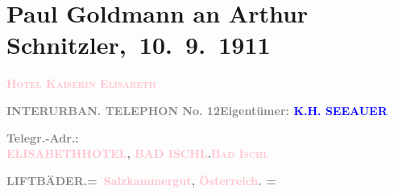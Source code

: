 

\renewcommand{\erwaehntePersonen}{Personen: Louise Schnitzler, Karl Seeauer, Helene Seeauer}
\renewcommand{\erwaehnteOrte}{Orte: Bad Ischl, Hotel Kaiserin Elisabeth, Salzkammergut, Wien, Österreich}
\renewcommand{\erwaehnteWerke}{}
\section[ Paul Goldmann an Arthur Schnitzler, 10. 9. 1911]{Paul Goldmann an Arthur Schnitzler, 10. 9. 1911}
\nopagebreak{}
\rehead{ }\normalsize\beginnumbering{}
\toendnotes[C]{\smallbreak\pagebreak[2]}
\toendnotes[C]{\smallbreak}
\pstart
           \noindent{}\centering{}{\pb}\textcolor{gray}{\textbf{\textbf{\textsc{\textcolor{pink}{Hotel Kaiserin Elisabeth}{}\ledrightnote{\textcolor{pink}{Hotel Kaiserin Elisabeth}}}}}}\pend
           
\pstart
           \noindent{}\textcolor{gray}{\textbf{INTERURBAN. TELEPHON No. 12}}\hfill \textcolor{gray}{\textbf{Eigentümer: \textcolor{blue}{K.}{}\ledrightnote{\textcolor{blue}{Karl Seeauer}}{ }{\kaufmannsund}{ }\textcolor{blue}{H. SEEAUER}{}\ledrightnote{\textcolor{blue}{Helene Seeauer}}}}\pend
           
\pstart
           \textcolor{gray}{\textbf{Telegr.-Adr.:}}{ }{\\}\textcolor{gray}{\textbf{\textcolor{pink}{ELISABETHHOTEL}{}\ledrightnote{\textcolor{pink}{Hotel Kaiserin Elisabeth}}, \textcolor{pink}{BAD ISCHL}{}\ledrightnote{\textcolor{pink}{Bad Ischl}}.}}\hfill \textcolor{gray}{\textbf{\textsc{\textcolor{pink}{Bad Ischl}{}\ledrightnote{\textcolor{pink}{Bad Ischl}}}}}\pend
           
\pstart
           \textcolor{gray}{\textbf{LIFT\hspace*{5em}BÄDER.}}\hfill \textcolor{gray}{\textbf{= \textcolor{pink}{Salzkammergut}{}\ledrightnote{\textcolor{pink}{Salzkammergut}}, \textcolor{pink}{Österreich}{}\ledrightnote{\textcolor{pink}{Österreich}}. =}}\pend
           
